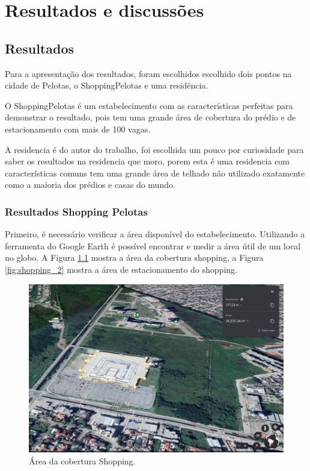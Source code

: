 \chapter{Resultados e discussões}\label{Resultados}

\section{Resultados}

Para a apresentação dos resultados, foram escolhidos escolhido dois pontos na cidade de Pelotas, o ShoppingPelotas \cite{shoppingpelotas} e uma residência.

O ShoppingPelotas é um estabelecimento com as características perfeitas para demonstrar o resultado, pois tem uma grande área de cobertura do prédio e de estacionamento com mais de 100 vagas.

A residencia é do autor do trabalho, foi escolhida um pouco por curiosidade para saber os resultados na residencia que moro, porem esta é uma residencia com características comuns tem uma grande área de telhado não utilizado exatamente como a maioria dos prédios e casas do mundo.

\subsection{Resultados Shopping Pelotas}

Primeiro, é necessário verificar a área disponível do estabelecimento. Utilizando a ferramenta do Google Earth \cite{Earth} é possível encontrar e medir a área útil de um local no globo. A Figura \ref{fig:shopping_1} mostra a área da cobertura shopping, a Figura \ref{fig:shopping_2} mostra a área de estacionamento do shopping.

\begin{figure}[H]
    \centering
    \includegraphics[width=1\textwidth]{./Figuras/shopping_1.png}
    \caption{Área da cobertura Shopping.}
   \label{fig:shopping_1}
\end{figure}

